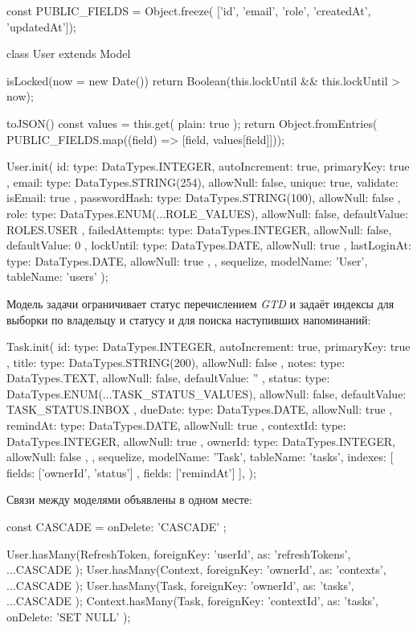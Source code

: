 \documentclass{stp}
\begin{document}
\begin{stplisting}
const PUBLIC_FIELDS = Object.freeze(
  ['id', 'email', 'role', 'createdAt', 'updatedAt']);

class User extends Model {
  isLocked(now = new Date()) {
    return Boolean(this.lockUntil && this.lockUntil > now);
  }

  toJSON() {
    const values = this.get({ plain: true });
    return Object.fromEntries(
      PUBLIC_FIELDS.map((field) => [field, values[field]]));
  }
}

User.init({
  id: { type: DataTypes.INTEGER, autoIncrement: true,
    primaryKey: true },
  email: { type: DataTypes.STRING(254), allowNull: false,
    unique: true, validate: { isEmail: true } },
  passwordHash: { type: DataTypes.STRING(100),
    allowNull: false },
  role: { type: DataTypes.ENUM(...ROLE_VALUES),
    allowNull: false, defaultValue: ROLES.USER },
  failedAttempts: { type: DataTypes.INTEGER,
    allowNull: false, defaultValue: 0 },
  lockUntil: { type: DataTypes.DATE, allowNull: true },
  lastLoginAt: { type: DataTypes.DATE, allowNull: true },
}, { sequelize, modelName: 'User', tableName: 'users' });
\end{stplisting}

Модель задачи ограничивает статус перечислением \textit{GTD} и задаёт индексы
для выборки по владельцу и статусу и для поиска наступивших напоминаний:

\begin{stplisting}
Task.init({
  id: { type: DataTypes.INTEGER, autoIncrement: true,
    primaryKey: true },
  title: { type: DataTypes.STRING(200), allowNull: false },
  notes: { type: DataTypes.TEXT, allowNull: false,
    defaultValue: '' },
  status: { type: DataTypes.ENUM(...TASK_STATUS_VALUES),
    allowNull: false, defaultValue: TASK_STATUS.INBOX },
  dueDate: { type: DataTypes.DATE, allowNull: true },
  remindAt: { type: DataTypes.DATE, allowNull: true },
  contextId: { type: DataTypes.INTEGER, allowNull: true },
  ownerId: { type: DataTypes.INTEGER, allowNull: false },
}, {
  sequelize, modelName: 'Task', tableName: 'tasks',
  indexes: [{ fields: ['ownerId', 'status'] },
    { fields: ['remindAt'] }],
});
\end{stplisting}

Связи между моделями объявлены в одном месте:

\begin{stplisting}
const CASCADE = { onDelete: 'CASCADE' };

User.hasMany(RefreshToken, { foreignKey: 'userId',
  as: 'refreshTokens', ...CASCADE });
User.hasMany(Context, { foreignKey: 'ownerId',
  as: 'contexts', ...CASCADE });
User.hasMany(Task, { foreignKey: 'ownerId',
  as: 'tasks', ...CASCADE });
Context.hasMany(Task, { foreignKey: 'contextId',
  as: 'tasks', onDelete: 'SET NULL' });
\end{stplisting}
\end{document}
